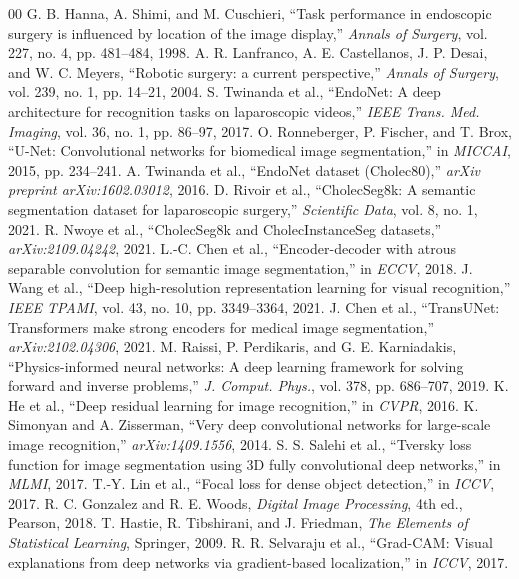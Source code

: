 \documentclass[conference]{IEEEtran}
\begin{document}
\begin{thebibliography}{00}
 G. B. Hanna, A. Shimi, and M. Cuschieri, ``Task performance in endoscopic surgery is influenced by location of the image display,'' \emph{Annals of Surgery}, vol. 227, no. 4, pp. 481--484, 1998.
 A. R. Lanfranco, A. E. Castellanos, J. P. Desai, and W. C. Meyers, ``Robotic surgery: a current perspective,'' \emph{Annals of Surgery}, vol. 239, no. 1, pp. 14--21, 2004.
 S. Twinanda et al., ``EndoNet: A deep architecture for recognition tasks on laparoscopic videos,'' \emph{IEEE Trans. Med. Imaging}, vol. 36, no. 1, pp. 86--97, 2017.
 O. Ronneberger, P. Fischer, and T. Brox, ``U-Net: Convolutional networks for biomedical image segmentation,'' in \emph{MICCAI}, 2015, pp. 234--241.
 A. Twinanda et al., ``EndoNet dataset (Cholec80),'' \emph{arXiv preprint arXiv:1602.03012}, 2016.
 D. Rivoir et al., ``CholecSeg8k: A semantic segmentation dataset for laparoscopic surgery,'' \emph{Scientific Data}, vol. 8, no. 1, 2021.
 R. Nwoye et al., ``CholecSeg8k and CholecInstanceSeg datasets,'' \emph{arXiv:2109.04242}, 2021.
 L.-C. Chen et al., ``Encoder-decoder with atrous separable convolution for semantic image segmentation,'' in \emph{ECCV}, 2018.
 J. Wang et al., ``Deep high-resolution representation learning for visual recognition,'' \emph{IEEE TPAMI}, vol. 43, no. 10, pp. 3349--3364, 2021.
 J. Chen et al., ``TransUNet: Transformers make strong encoders for medical image segmentation,'' \emph{arXiv:2102.04306}, 2021.
 M. Raissi, P. Perdikaris, and G. E. Karniadakis, ``Physics-informed neural networks: A deep learning framework for solving forward and inverse problems,'' \emph{J. Comput. Phys.}, vol. 378, pp. 686--707, 2019.
 K. He et al., ``Deep residual learning for image recognition,'' in \emph{CVPR}, 2016.
 K. Simonyan and A. Zisserman, ``Very deep convolutional networks for large-scale image recognition,'' \emph{arXiv:1409.1556}, 2014.
 S. S. Salehi et al., ``Tversky loss function for image segmentation using 3D fully convolutional deep networks,'' in \emph{MLMI}, 2017.
 T.-Y. Lin et al., ``Focal loss for dense object detection,'' in \emph{ICCV}, 2017.
 R. C. Gonzalez and R. E. Woods, \emph{Digital Image Processing}, 4th ed., Pearson, 2018.
 T. Hastie, R. Tibshirani, and J. Friedman, \emph{The Elements of Statistical Learning}, Springer, 2009.
 R. R. Selvaraju et al., ``Grad-CAM: Visual explanations from deep networks via gradient-based localization,'' in \emph{ICCV}, 2017.

\end{thebibliography}
\end{document}
